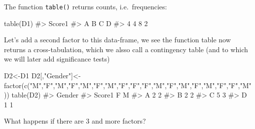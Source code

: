 \documentclass[
  letterpaper,
  DIV=11,
  numbers=noendperiod]{scrreprt}
\newenvironment{Shaded}{\begin{snugshade}}{\end{snugshade}}
\newcommand{\CommentTok}[1]{\textcolor[rgb]{0.37,0.37,0.37}{#1}}
\newcommand{\FunctionTok}[1]{\textcolor[rgb]{0.28,0.35,0.67}{#1}}
\newcommand{\NormalTok}[1]{\textcolor[rgb]{0.00,0.23,0.31}{#1}}
\newcommand{\OtherTok}[1]{\textcolor[rgb]{0.00,0.23,0.31}{#1}}
\newcommand{\StringTok}[1]{\textcolor[rgb]{0.13,0.47,0.30}{#1}}
\begin{document}
The function \texttt{table()} returns counts, i.e.~frequencies:

\begin{Shaded}
\begin{Highlighting}[]
\FunctionTok{table}\NormalTok{(D1)}
\CommentTok{\#\textgreater{} Score1}
\CommentTok{\#\textgreater{} A B C D }
\CommentTok{\#\textgreater{} 4 4 8 2}
\end{Highlighting}
\end{Shaded}

Let's add a second factor to this data-frame, we see the function table
now returns a cross-tabulation, which we alsso call a contingency table
(and to which we will later add significance tests)

\begin{Shaded}
\begin{Highlighting}[]
\NormalTok{D2}\OtherTok{\textless{}{-}}\NormalTok{D1}
\NormalTok{D2[,}\StringTok{"Gender"}\NormalTok{]}\OtherTok{\textless{}{-}}\FunctionTok{factor}\NormalTok{(}\FunctionTok{c}\NormalTok{(}\StringTok{"M"}\NormalTok{,}\StringTok{"F"}\NormalTok{,}\StringTok{"M"}\NormalTok{,}\StringTok{"F"}\NormalTok{,}\StringTok{"M"}\NormalTok{,}\StringTok{"F"}\NormalTok{,}\StringTok{"M"}\NormalTok{,}\StringTok{"F"}\NormalTok{,}\StringTok{"F"}\NormalTok{,}\StringTok{"F"}\NormalTok{,}\StringTok{"M"}\NormalTok{,}\StringTok{"F"}\NormalTok{,}\StringTok{"M"}\NormalTok{,}\StringTok{"F"}\NormalTok{,}\StringTok{"M"}\NormalTok{,}\StringTok{"F"}\NormalTok{,}\StringTok{"F"}\NormalTok{,}\StringTok{"M"}\NormalTok{))}
\FunctionTok{table}\NormalTok{(D2)}
\CommentTok{\#\textgreater{}       Gender}
\CommentTok{\#\textgreater{} Score1 F M}
\CommentTok{\#\textgreater{}      A 2 2}
\CommentTok{\#\textgreater{}      B 2 2}
\CommentTok{\#\textgreater{}      C 5 3}
\CommentTok{\#\textgreater{}      D 1 1}
\end{Highlighting}
\end{Shaded}

What happens if there are 3 and more factors?
\end{document}
